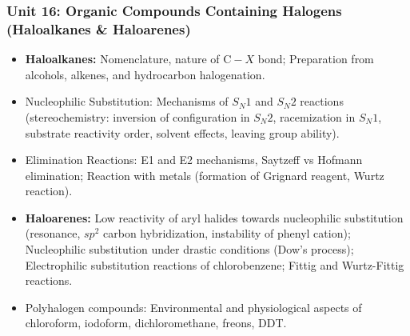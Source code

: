 \documentclass[11pt,a4paper]{article}
\begin{document}
\subsubsection{Unit 16: Organic Compounds Containing Halogens (Haloalkanes \& Haloarenes)}
\begin{itemize}
  \item \textbf{Haloalkanes:} Nomenclature, nature of $\text{C}-X$ bond; Preparation from alcohols, alkenes, and hydrocarbon halogenation.
  \item Nucleophilic Substitution: Mechanisms of $S_N 1$ and $S_N 2$ reactions (stereochemistry: inversion of configuration in $S_N 2$, racemization in $S_N 1$, substrate reactivity order, solvent effects, leaving group ability).
  \item Elimination Reactions: E1 and E2 mechanisms, Saytzeff vs Hofmann elimination; Reaction with metals (formation of Grignard reagent, Wurtz reaction).
  \item \textbf{Haloarenes:} Low reactivity of aryl halides towards nucleophilic substitution (resonance, $sp^2$ carbon hybridization, instability of phenyl cation); Nucleophilic substitution under drastic conditions (Dow's process); Electrophilic substitution reactions of chlorobenzene; Fittig and Wurtz-Fittig reactions.
  \item Polyhalogen compounds: Environmental and physiological aspects of chloroform, iodoform, dichloromethane, freons, DDT.
\end{itemize}
\end{document}
